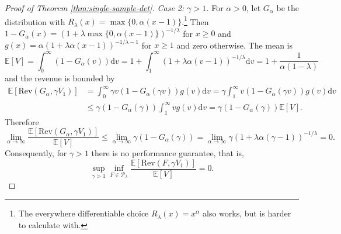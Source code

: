 \documentclass[11pt]{article}
\newcommand{\E}{\mathbb{E}}
\newcommand{\dd}{\mathrm{d}}
\begin{document}
\begin{proof}[Proof of Theorem \ref{thm:single-sample-det}]
    \noindent\textit{Case 2: $\gamma > 1$.} For $\alpha > 0$, let $G_\alpha$ be the distribution with $R_\lambda(x)=\max\{0,\alpha (x-1)\}$.\footnote{The everywhere differentiable choice $R_\lambda(x)=x^\alpha$ also works, but is harder to calculate with.} 
    Then $1-G_\alpha(x)=(1+\lambda\max\{0,\alpha(x-1)\})^{-1/\lambda}$ for $x\ge 0$ and $g(x)=\alpha (1+\lambda \alpha(x-1) )^{-1/\lambda-1}$ for $x\ge 1$ and zero otherwise. 
    The mean is
    $$
    \E[V]=\int_0^\infty(1-G_\alpha(v))\dd v=1+\int_1^\infty(1+\lambda\alpha(v-1))^{-1/\lambda}\dd v=1+\frac{1}{\alpha(1-\lambda)}
    $$
    and the revenue is bounded by 
    \begin{align*}
        \E[\mathrm{Rev}(G_\alpha, \gamma V_1)]&=\int_0^\infty\gamma v(1-G_\alpha(\gamma v))g(v)\dd v=\gamma\int_1^\infty v(1-G_\alpha(\gamma v))g(v)\dd v\\
        &\le \gamma(1-G_\alpha(\gamma ))\int_1^\infty vg(v)\dd v= \gamma(1-G_\alpha(\gamma ))\E[V].
    \end{align*}
    Therefore 
    $$
    \lim_{\alpha\to \infty}\frac{\E[\mathrm{Rev}(G_\alpha, \gamma V_1)]}{\E[V]}\le \lim_{\alpha\to \infty}\gamma(1-G_\alpha(\gamma ))=  \lim_{\alpha\to \infty}\gamma (1+\lambda\alpha(\gamma-1))^{-1/\lambda}=0.
    $$
    Consequently, for $\gamma > 1$ there is no performance guarantee, that is,
    $$
    \sup_{\gamma > 1}\inf_{F\in\mathcal{P}_{\lambda}}\frac{\E[\mathrm{Rev}(F, \gamma V_1)]}{\E[V]}=0.
    $$


\end{proof}
\end{document}
